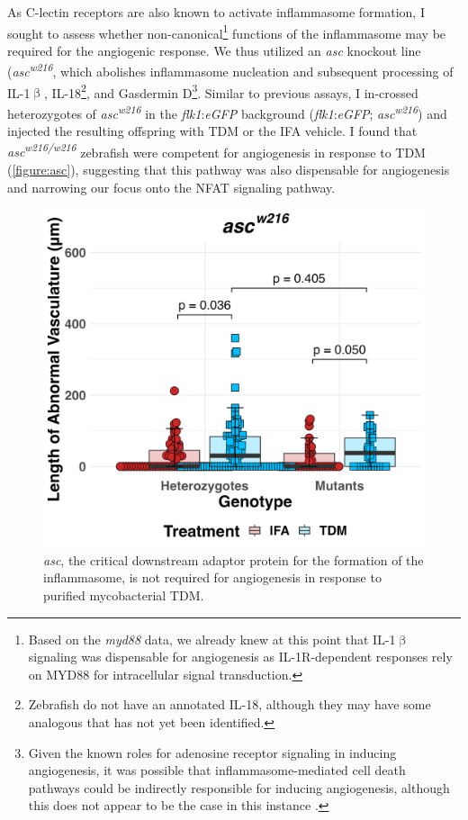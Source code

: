As C\hyp{}lectin receptors are also known to activate inflammasome formation, I sought to assess whether non\hyp{}canonical\footnote{Based on the \textit{myd88} data, we already knew at this point that IL\hyp{}1$\upbeta$ signaling was dispensable for angiogenesis as IL\hyp{}1R\hyp{}dependent responses rely on MYD88 for intracellular signal transduction.} functions of the inflammasome may be required for the angiogenic response. We thus utilized an \textit{asc} knockout line (\textit{asc\textsuperscript{w216}}, which abolishes inflammasome nucleation and subsequent processing of IL\hyp{}1$\upbeta$, IL\hyp{}18\footnote{Zebrafish do not have an annotated IL\hyp{}18, although they may have some analogous that has not yet been identified.}, and Gasdermin D\footnote{Given the known roles for adenosine receptor signaling in inducing angiogenesis, it was possible that inflammasome\hyp{}mediated cell death pathways could be indirectly responsible for inducing angiogenesis, although this does not appear to be the case in this instance \citep{Clark2007, Montesinos2002, Dusseau1986, Auchampach2007}.}. Similar to previous assays, I in\hyp{}crossed heterozygotes of \textit{asc\textsuperscript{w216}} in the \textit{flk1}:\textit{eGFP} background (\textit{flk1}:\textit{eGFP}; \textit{asc\textsuperscript{w216}}) and injected the resulting offspring with TDM or the IFA vehicle. I found that \textit{asc\textsuperscript{w216/w216}} zebrafish were competent for angiogenesis in response to TDM (\autoref{figure:asc}), suggesting that this pathway was also dispensable for angiogenesis and narrowing our focus onto the NFAT signaling pathway.

\begin{figure}
\centering
\includegraphics[width=\textwidth]{images/asc_tdm_110922.png}
\caption[\textit{asc} is dispensable for angiogenesis]{\textit{asc}, the critical downstream adaptor protein for the formation of the inflammasome, is not required for angiogenesis in response to purified mycobacterial TDM.}
\label{figure:asc}
\end{figure}

